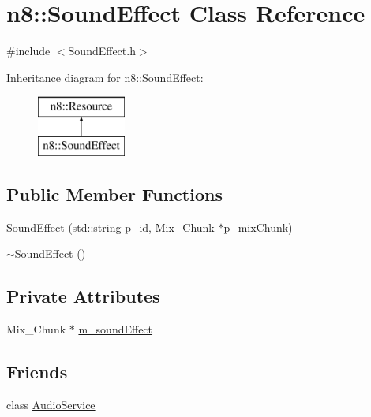 \hypertarget{classn8_1_1_sound_effect}{\section{n8\-:\-:Sound\-Effect Class Reference}
\label{classn8_1_1_sound_effect}
}


{\ttfamily \#include $<$Sound\-Effect.\-h$>$}

Inheritance diagram for n8\-:\-:Sound\-Effect\-:\begin{figure}[H]
\begin{center}
\leavevmode
\includegraphics[height=2.000000cm]{classn8_1_1_sound_effect}
\end{center}
\end{figure}
\subsection*{Public Member Functions}
\begin{DoxyCompactItemize}
\item 
\hyperlink{classn8_1_1_sound_effect_a9c5c649a5ea25826ea5f3171df2d8dee}{Sound\-Effect} (std\-::string p\-\_\-id, Mix\-\_\-\-Chunk $\ast$p\-\_\-mix\-Chunk)
\item 
\hyperlink{classn8_1_1_sound_effect_adb0887888f815d5796a20a1e515d1592}{$\sim$\-Sound\-Effect} ()
\end{DoxyCompactItemize}
\subsection*{Private Attributes}
\begin{DoxyCompactItemize}
\item 
Mix\-\_\-\-Chunk $\ast$ \hyperlink{classn8_1_1_sound_effect_a5faa9a06016c7cef864ccb8d27740a33}{m\-\_\-sound\-Effect}
\end{DoxyCompactItemize}
\subsection*{Friends}
\begin{DoxyCompactItemize}
\item 
class \hyperlink{classn8_1_1_sound_effect_a37b580cb33a7b41e459ef8adf3e2dd75}{Audio\-Service}
\end{DoxyCompactItemize}


